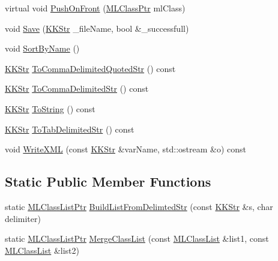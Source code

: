 \begin{DoxyCompactItemize}
virtual void \hyperlink{class_k_k_m_l_l_1_1_m_l_class_list_ac3022791a21da4fd7779d9b557d094dc}{Push\+On\+Front} (\hyperlink{namespace_k_k_m_l_l_ac272393853d59e72e8456f14cd6d8c23}{M\+L\+Class\+Ptr} ml\+Class)
\item 
void \hyperlink{class_k_k_m_l_l_1_1_m_l_class_list_a28e7a0cde0d0aa78e0159451be973cfd}{Save} (\hyperlink{class_k_k_b_1_1_k_k_str}{K\+K\+Str} \+\_\+file\+Name, bool \&\+\_\+successfull)
\item 
void \hyperlink{class_k_k_m_l_l_1_1_m_l_class_list_a00b4e0ed01e65ca7e6c21c285ea45c02}{Sort\+By\+Name} ()
\item 
\hyperlink{class_k_k_b_1_1_k_k_str}{K\+K\+Str} \hyperlink{class_k_k_m_l_l_1_1_m_l_class_list_ad8e24a6af4317d815a9c190deb3837e7}{To\+Comma\+Delimited\+Quoted\+Str} () const 
\item 
\hyperlink{class_k_k_b_1_1_k_k_str}{K\+K\+Str} \hyperlink{class_k_k_m_l_l_1_1_m_l_class_list_a2842ee0f0a658c29988b02bf5cbe19d7}{To\+Comma\+Delimited\+Str} () const 
\item 
\hyperlink{class_k_k_b_1_1_k_k_str}{K\+K\+Str} \hyperlink{class_k_k_m_l_l_1_1_m_l_class_list_a7456f72caf6033203f30cff0464c5fa7}{To\+String} () const 
\item 
\hyperlink{class_k_k_b_1_1_k_k_str}{K\+K\+Str} \hyperlink{class_k_k_m_l_l_1_1_m_l_class_list_a1e736f380a4dc7140350279ff6166d54}{To\+Tab\+Delimited\+Str} () const 
\item 
void \hyperlink{class_k_k_m_l_l_1_1_m_l_class_list_aaa52f4be75a82ba4b62051e25df4a6f3}{Write\+X\+ML} (const \hyperlink{class_k_k_b_1_1_k_k_str}{K\+K\+Str} \&var\+Name, std\+::ostream \&o) const 
\end{DoxyCompactItemize}
\subsection*{Static Public Member Functions}
\begin{DoxyCompactItemize}
\item 
static \hyperlink{namespace_k_k_m_l_l_af091cde3f4a4315658b41a5e7583fc26}{M\+L\+Class\+List\+Ptr} \hyperlink{class_k_k_m_l_l_1_1_m_l_class_list_a7c3d83212318e7fd8b06d7ae3522d145}{Build\+List\+From\+Delimted\+Str} (const \hyperlink{class_k_k_b_1_1_k_k_str}{K\+K\+Str} \&s, char delimiter)
\item 
static \hyperlink{namespace_k_k_m_l_l_af091cde3f4a4315658b41a5e7583fc26}{M\+L\+Class\+List\+Ptr} \hyperlink{class_k_k_m_l_l_1_1_m_l_class_list_afd0809f283f85dca95cd2c35ea22ac2d}{Merge\+Class\+List} (const \hyperlink{class_k_k_m_l_l_1_1_m_l_class_list}{M\+L\+Class\+List} \&list1, const \hyperlink{class_k_k_m_l_l_1_1_m_l_class_list}{M\+L\+Class\+List} \&list2)
\end{DoxyCompactItemize}
